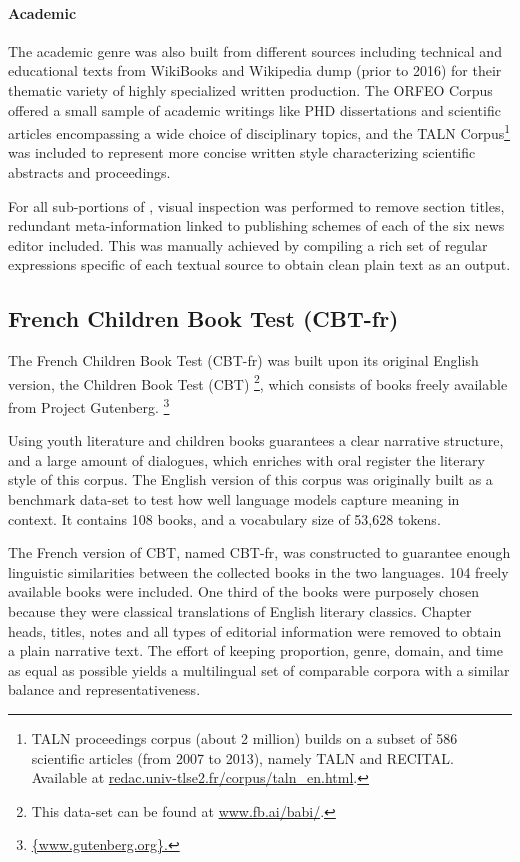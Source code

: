 \paragraph{\Cabernet Academic} \label{subsec:DescribeCaBeRnetAcad}
The academic genre was also built from different sources including technical and educational texts from WikiBooks and Wikipedia dump (prior to 2016) for their thematic variety of highly specialized written production. The \textsc{ORFEO} Corpus offered a small sample of academic writings like PHD dissertations and scientific articles encompassing a wide choice of disciplinary topics, and the TALN Corpus\footnote{TALN proceedings corpus (about 2 million) builds on a subset of 586 scientific articles (from 2007 to 2013), namely TALN and RECITAL. Available at \url{redac.univ-tlse2.fr/corpus/taln_en.html}.} was included to represent more concise written style characterizing scientific abstracts and proceedings.

For all sub-portions of \Cabernet, visual inspection was performed to remove section titles, redundant meta-information linked to publishing schemes of each of the six news editor included. This was manually achieved by compiling a rich set of regular expressions specific of each textual source to obtain clean plain text as an output.

\subsection{French Children Book Test (CBT-fr)}
\label{subsec:DescribeCBT}

The French Children Book Test (CBT-fr) was built upon its original English version, the Children Book Test (CBT) \citep{hill-etal-2016-the}\footnote{This data-set can be found at \url{www.fb.ai/babi/}.}, which consists of books freely available from Project Gutenberg. \footnote{\url{{www.gutenberg.org}.}}

Using youth literature and children books guarantees a clear narrative structure, and a large amount of dialogues, which enriches with oral register the literary style of this corpus. The English version of this corpus was originally built as a benchmark data-set to test how well language models capture meaning in context. It contains 108 books, and a vocabulary size of 53,628 tokens.

The French version of CBT, named CBT-fr, was constructed to guarantee enough linguistic similarities between the collected books in the two languages. 104 freely available books were included. One third of the books were purposely chosen because they were classical translations of English literary classics. Chapter heads, titles, notes and all types of editorial information were removed to obtain a plain narrative text. The effort of keeping proportion, genre, domain, and time as equal as possible yields a multilingual set of comparable corpora with a similar balance and representativeness.

